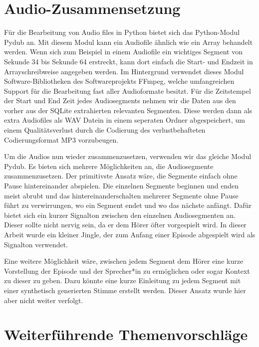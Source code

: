 \section{Audio-Zusammensetzung}


Für die Bearbeitung von Audio files in Python bietet sich das Python-Modul Pydub an. 
Mit diesem Modul kann ein Audiofile ähnlich wie ein Array behandelt werden.
Wenn sich zum Beispiel in einem Audiofile ein wichtiges Segment von Sekunde 34 bis Sekunde 64 erstreckt,  kann dort einfach die Start- und Endzeit in Arrayschreibweise angegeben werden.
Im Hintergrund verwendet dieses Modul Software-Bibliotheken des Softwareprojekts FFmpeg, welche umfangreichen Support für die Bearbeitung fast aller Audioformate besitzt.\cite{ffmpeg}
Für die Zeitstempel der Start und End Zeit jedes Audiosegments nehmen wir die Daten aus den vorher aus der SQLite extrahierten relevanten Segmenten.
Diese werden dann als extra Audiofiles als WAV Datein in einem seperaten Ordner abgespeichert, um einem Qualitätsverlust durch die Codierung des verlustbehafteten Codierungsformat MP3 vorzubeugen.

Um die Audios nun wieder zusammenzusetzen, verwenden wir das gleiche Modul Pydub. 
Es bieten sich mehrere Möglichkeiten an, die Audiosegmente zusammenzusetzen. 
Der primitivste Ansatz wäre, die Segmente einfach ohne Pause hintereinander abspielen. 
Die einzelnen Segmente beginnen und enden meist abrubt und das hintereinanderschalten mehrerer Segmente ohne Pause führt zu verwirrungen, wo ein Segment endet und wo das nächste anfängt.
Dafür bietet sich ein kurzer Signalton zwischen den einzelnen Audiosegmenten an. 
Dieser sollte nicht nervig sein, da er dem Hörer öfter vorgespielt wird. 
In dieser Arbeit wurde ein kleiner Jingle, der zum Anfang einer Episode abgespielt wird als Signalton verwendet.

Eine weitere Möglichkeit wäre, zwischen jedem Segment dem Hörer eine kurze Vorstellung der Episode und der Sprecher*in zu ermöglichen oder sogar Kontext zu dieser zu geben. 
Dazu könnte eine kurze Einleitung zu jedem Segment mit einer synthetisch generierten Stimme erstellt werden.
Dieser Ansatz wurde hier aber nicht weiter verfolgt.

\section{Weiterführende Themenvorschläge}

